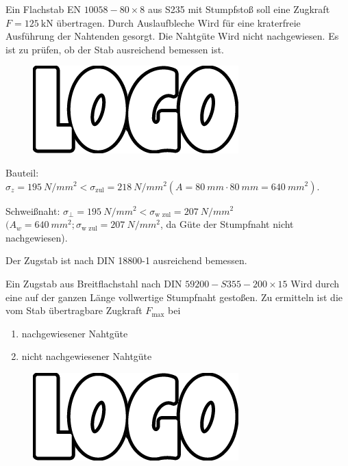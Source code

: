 \documentclass[11pt,a4paper]{scrartcl}
\begin{document}
\begin{question}
	Ein Flachstab EN $10058-80\times8$ aus S235 mit Stumpfstoß soll eine Zugkraft $F= \SI{125}{\kilo\newton}$ übertragen. Durch Auslaufbleche Wird für eine kraterfreie Ausführung der Nahtenden gesorgt. Die Nahtgüte Wird nicht nachgewiesen.	Es ist zu prüfen, ob der Stab ausreichend bemessen ist.
	\begin{figure}[H]
		\centering\includegraphics[width=.8\columnwidth]{logo}
	\end{figure}
\end{question}
\begin{solution}[print]
Bauteil: $\sigma_z = \SI{195}{N\per mm^2}  < \sigma_{\text{zul}} = \SI{218}{N\per mm^2} (A = \SI{80}{mm} \cdot\SI{80}{mm} = \SI{640}{mm^2}).$

Schweißnaht: $\sigma_\bot = \SI{195}{N\per mm^2} < \sigma_{\text{w zul}} = \SI{207}{N\per mm^2}$ $(A_w = \SI{640}{mm^2}; \sigma_{\text{w zul}} = \SI{207}{N\per mm^2}$, da Güte der Stumpfnaht nicht nachgewiesen).

Der Zugstab ist nach DIN 18800-1 ausreichend bemessen.
\end{solution}
\begin{question}
Ein Zugstab aus Breitflachstahl nach DIN $59200-S355-200\times15$ Wird durch eine auf der ganzen Länge vollwertige Stumpfnaht gestoßen. Zu ermitteln ist die vom Stab übertragbare Zugkraft $F_{\text{max}}$ bei
\begin{enumerate}
	\item nachgewiesener Nahtgüte
	\item nicht nachgewiesener Nahtgüte
\end{enumerate}
\begin{figure}[H]
	\centering\includegraphics[width=.8\columnwidth]{logo}
\end{figure}
\end{question}
\end{document}
